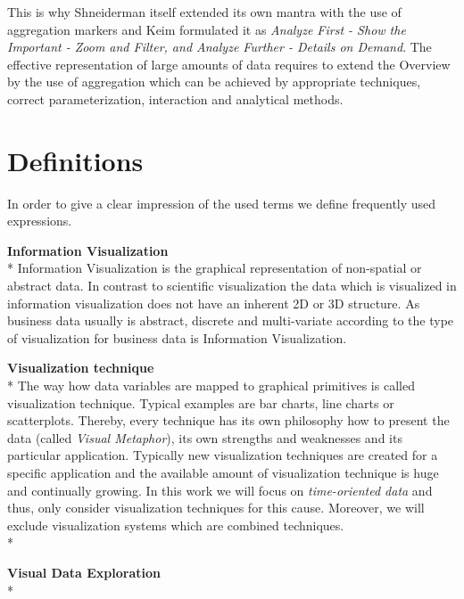 This is why Shneiderman itself extended its own mantra with the use of aggregation markers and Keim formulated it as \textit{Analyze First - Show the Important - Zoom and Filter, and Analyze Further - Details on Demand}\cite{Keima}. The effective representation of large amounts of data requires to extend the Overview by the use of aggregation which can be achieved by appropriate techniques, correct parameterization, interaction and analytical methods\cite{Aigner2008}. 







\section{Definitions}
In order to give a clear impression of the used terms we define frequently used expressions.

\textbf{Information Visualization}\\*
Information Visualization is the graphical representation of non-spatial or abstract data\cite{Keim}. In contrast to scientific visualization the data which is visualized in information visualization does not have an inherent 2D or 3D structure\cite{Shneiderman2008}. 
As business data usually is abstract, discrete and multi-variate according to \cite{Tegarden1999} the type of visualization for business data is Information Visualization.

\textbf{Visualization technique}\\*
The way how data variables are mapped to graphical primitives is called visualization technique. Typical examples are bar charts, line charts or scatterplots. Thereby, every technique has its own philosophy how to present the data (called \textit{Visual Metaphor}\cite{Tegarden1999}), its own strengths and weaknesses and its particular application. Typically new visualization techniques are created for a specific application and the available amount of visualization technique is huge and continually growing. In this work we will focus on \textit{time-oriented data} and thus, only consider visualization techniques for this cause. Moreover, we will exclude visualization systems which are combined techniques. 
\\*

\textbf{Visual Data Exploration}\\*

